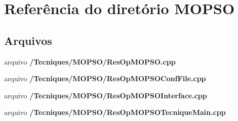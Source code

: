 \section{Referência do diretório M\+O\+P\+SO}
\label{dir_1fe0fa4bfa0fa2c513f52556873cd379}
\subsection*{Arquivos}
\begin{DoxyCompactItemize}
\item 
arquivo {\bf /\+Tecniques/\+M\+O\+P\+S\+O/\+Res\+Op\+M\+O\+P\+S\+O.\+cpp}
\item 
arquivo {\bf /\+Tecniques/\+M\+O\+P\+S\+O/\+Res\+Op\+M\+O\+P\+S\+O\+Conf\+File.\+cpp}
\item 
arquivo {\bf /\+Tecniques/\+M\+O\+P\+S\+O/\+Res\+Op\+M\+O\+P\+S\+O\+Interface.\+cpp}
\item 
arquivo {\bf /\+Tecniques/\+M\+O\+P\+S\+O/\+Res\+Op\+M\+O\+P\+S\+O\+Tecnique\+Main.\+cpp}
\end{DoxyCompactItemize}

